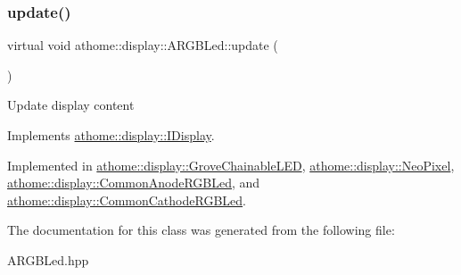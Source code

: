 \subsubsection{\texorpdfstring{update()}{update()}}
{\footnotesize\ttfamily virtual void athome\+::display\+::\+A\+R\+G\+B\+Led\+::update (\begin{DoxyParamCaption}{ }\end{DoxyParamCaption})\hspace{0.3cm}{\ttfamily [pure virtual]}}

Update display content 

Implements \mbox{\hyperlink{classathome_1_1display_1_1_i_display_a4ba7bd5d46f88578f1c846f4f5f3c5d1}{athome\+::display\+::\+I\+Display}}.



Implemented in \mbox{\hyperlink{classathome_1_1display_1_1_grove_chainable_l_e_d_a05a4a1381396b7fc11a24993865d8226}{athome\+::display\+::\+Grove\+Chainable\+L\+ED}}, \mbox{\hyperlink{classathome_1_1display_1_1_neo_pixel_a272bca4da78dff7dc02bcd023665e013}{athome\+::display\+::\+Neo\+Pixel}}, \mbox{\hyperlink{classathome_1_1display_1_1_common_anode_r_g_b_led_ab7daf7dcc6ac1e3fcab202cae484b237}{athome\+::display\+::\+Common\+Anode\+R\+G\+B\+Led}}, and \mbox{\hyperlink{classathome_1_1display_1_1_common_cathode_r_g_b_led_ab78ab6aef619d8e0941dd11d4cfbb545}{athome\+::display\+::\+Common\+Cathode\+R\+G\+B\+Led}}.



The documentation for this class was generated from the following file\+:\begin{DoxyCompactItemize}
\item 
A\+R\+G\+B\+Led.\+hpp\end{DoxyCompactItemize}
